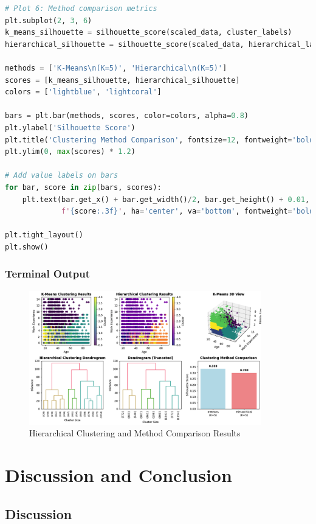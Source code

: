 \documentclass[12pt,a4paper]{article}
\begin{document}
\begin{lstlisting}[language=Python, caption=Hierarchical Clustering and Method Comparison]
# Plot 6: Method comparison metrics
plt.subplot(2, 3, 6)
k_means_silhouette = silhouette_score(scaled_data, cluster_labels)
hierarchical_silhouette = silhouette_score(scaled_data, hierarchical_labels)

methods = ['K-Means\n(K=5)', 'Hierarchical\n(K=5)']
scores = [k_means_silhouette, hierarchical_silhouette]
colors = ['lightblue', 'lightcoral']

bars = plt.bar(methods, scores, color=colors, alpha=0.8)
plt.ylabel('Silhouette Score')
plt.title('Clustering Method Comparison', fontsize=12, fontweight='bold')
plt.ylim(0, max(scores) * 1.2)

# Add value labels on bars
for bar, score in zip(bars, scores):
    plt.text(bar.get_x() + bar.get_width()/2, bar.get_height() + 0.01,
             f'{score:.3f}', ha='center', va='bottom', fontweight='bold')

plt.tight_layout()
plt.show()
\end{lstlisting}

\subsubsection{Terminal Output}

\begin{figure}[htbp]
\centering
\includegraphics[width=0.9\textwidth]{Figures/comparison_cluster.png}
\caption{Hierarchical Clustering and Method Comparison Results}
\end{figure}

\newpage
\section{Discussion and Conclusion}

\subsection{Discussion}
\end{document}
